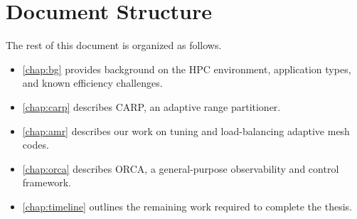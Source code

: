 \section{Document Structure}

The rest of this document is organized as follows.

\begin{itemize}
  \item \cref{chap:bg} provides background on the HPC environment, application types, and known efficiency challenges.
  \item \cref{chap:carp} describes CARP, an adaptive range partitioner.
  \item \cref{chap:amr} describes our work on tuning and load-balancing adaptive mesh codes.
  \item \cref{chap:orca} describes ORCA, a general-purpose observability and control framework.
  \item \cref{chap:timeline} outlines the remaining work required to complete the thesis.
\end{itemize}